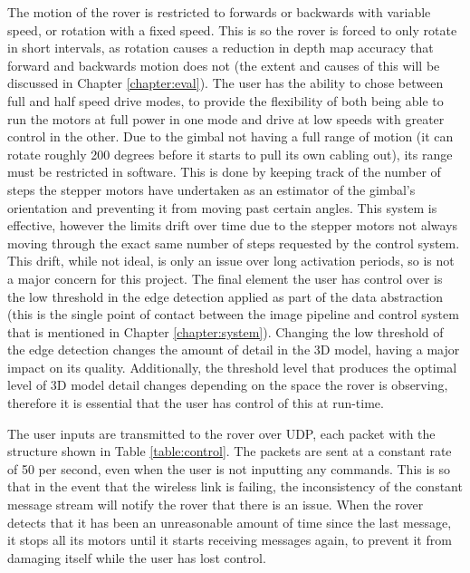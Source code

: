 The motion of the rover is restricted to forwards or backwards with variable speed, or rotation with a fixed speed. This is so the rover is forced to only rotate in short intervals, as rotation causes a reduction in depth map accuracy that forward and backwards motion does not (the extent and causes of this will be discussed in Chapter \ref{chapter:eval}). The user has the ability to chose between full and half speed drive modes, to provide the flexibility of both being able to run the motors at full power in one mode and drive at low speeds with greater control in the other. Due to the gimbal not having a full range of motion (it can rotate roughly 200 degrees before it starts to pull its own cabling out), its range must be restricted in software. This is done by keeping track of the number of steps the stepper motors have undertaken as an estimator of the gimbal's orientation and preventing it from moving past certain angles. This system is effective, however the limits drift over time due to the stepper motors not always moving through the exact same number of steps requested by the control system. This drift, while not ideal, is only an issue over long activation periods, so is not a major concern for this project. The final element the user has control over is the low threshold in the edge detection applied as part of the data abstraction (this is the single point of contact between the image pipeline and control system that is mentioned in Chapter \ref{chapter:system}). Changing the low threshold of the edge detection changes the amount of detail in the 3D model, having a major impact on its quality. Additionally, the threshold level that produces the optimal level of 3D model detail changes depending on the space the rover is observing, therefore it is essential that the user has control of this at run-time.

The user inputs are transmitted to the rover over UDP, each packet with the structure shown in Table \ref{table:control}. The packets are sent at a constant rate of 50 per second, even when the user is not inputting any commands. This is so that in the event that the wireless link is failing, the inconsistency of the constant message stream will notify the rover that there is an issue. When the rover detects that it has been an unreasonable amount of time since the last message, it stops all its motors until it starts receiving messages again, to prevent it from damaging itself while the user has lost control.

